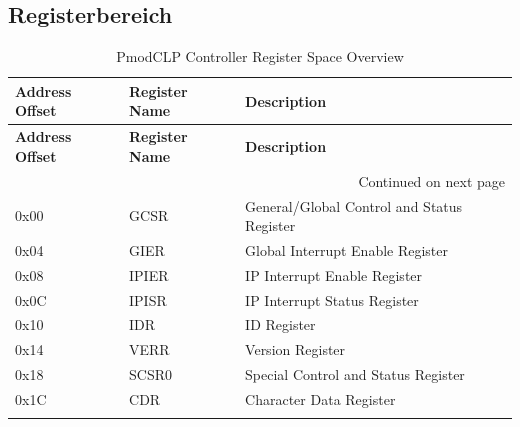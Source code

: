 \subsection{Registerbereich}
\begin{longtable}{|p{3cm}|p{3cm}|p{8cm}|}
    \hline
    \textbf{Address Offset} & \textbf{Register Name} & \textbf{Description} \\
    \hline
    \endfirsthead
    \hline
    \textbf{Address Offset} & \textbf{Register Name} & \textbf{Description} \\
    \hline
    \endhead
    \hline \multicolumn{3}{|r|}{{Continued on next page}} \\ \hline
    \endfoot
    \hline
    \endlastfoot

    0x00 & GCSR & General/Global Control and Status Register \\
    \hline
    0x04 & GIER & Global Interrupt Enable Register \\
    \hline
    0x08 & IPIER & IP Interrupt Enable Register \\
    \hline
    0x0C & IPISR & IP Interrupt Status Register \\
    \hline
    0x10 & IDR & ID Register \\
    \hline
    0x14 & VERR & Version Register \\
    \hline
    0x18 & SCSR0 & Special Control and Status Register \\
    \hline
    0x1C & CDR & Character Data Register \\
    \hline
    \caption{PmodCLP Controller Register Space Overview}
    \label{tab:register_overview}
    \end{longtable}

